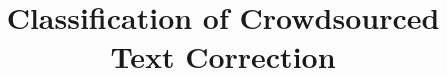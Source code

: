 \documentclass{acm_proc_article-sp}
\begin{document}
\title{ Classification of Crowdsourced Text Correction}

%
%
%
%
%
\end{document}
